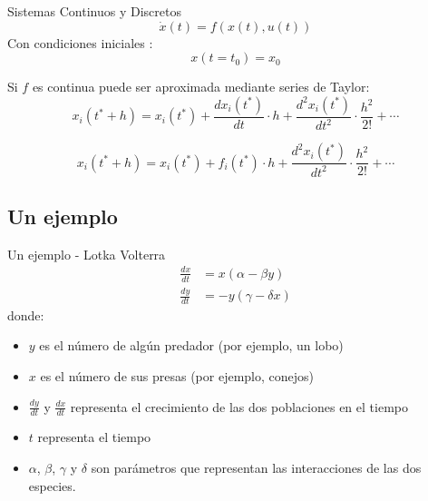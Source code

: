\documentclass[10pt,presentation]{beamer}
\begin{document}
\begin{frame}{Sistemas Continuos y Discretos}
	\begin{equation*} 
	\dot{x}(t) = f (x(t), u(t))
	\end{equation*}
	Con condiciones iniciales :
	\begin{equation*}
	x(t = t_0 ) = x_0
	\end{equation*}

	Si $f$ es continua puede ser aproximada mediante series de Taylor:
	\begin{equation*}
		x_i(t^* + h) = x_i(t^*) + \frac{dx_i (t^*)}{dt} \cdot h + \frac{d^{2}x_i (t^*)}{dt^2} \cdot \frac{h^2}{2!} + \cdots
	\end{equation*}

	\begin{equation*}
		x_i(t^* + h) = x_i(t^*) + f_i(t^*) \cdot h + \frac{d^{2}x_i (t^*)}{dt^2} \cdot \frac{h^2}{2!} + \cdots
	\end{equation*}


\end{frame}

	\subsection{Un ejemplo}

\begin{frame}{Un ejemplo - Lotka Volterra}
	\begin{align*}
		\frac{dx}{dt} &= x(\alpha - \beta y) \\
		\frac{dy}{dt} &= - y(\gamma - \delta  x)
	\end{align*}
	donde:
	\begin{itemize}
		\item $y$ es el número de algún predador (por ejemplo, un lobo)
		\item $x$ es el número de sus presas (por ejemplo, conejos)
		\item $\frac{dy}{dt}$ y $\frac{dx}{dt}$ representa el crecimiento de las dos poblaciones en el tiempo
		\item $t$ representa el tiempo 
		\item $\alpha$, $\beta$, $\gamma$ y $\delta$ son parámetros que representan las interacciones de las dos especies.
	\end{itemize}
\end{frame}
\end{document}
